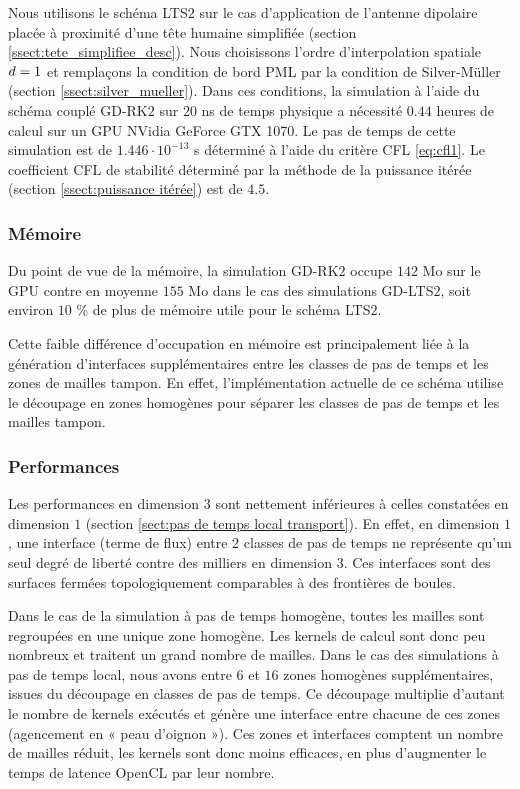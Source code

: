 Nous utilisons le schéma LTS$2$ sur le cas d'application de
l'antenne dipolaire placée à proximité d'une tête humaine simplifiée
(section \ref{ssect:tete_simplifiee_desc}).
Nous choisissons l'ordre d'interpolation spatiale $d = 1$ et
remplaçons la condition de bord PML par la condition de
Silver-Müller (section \ref{ssect:silver_mueller}).
Dans ces conditions, la simulation à l'aide du schéma couplé GD-RK$2$
sur $20$ ns de temps physique a nécessité $0.44$ heures de calcul
sur un GPU NVidia GeForce GTX 1070.
Le pas de temps de cette simulation est de $1.446 \cdot 10^{-13}$ s
déterminé à l'aide du critère CFL \eqref{eq:cfl1}.
Le coefficient CFL de stabilité déterminé par la méthode
de la puissance itérée (section \ref{ssect:puissance itérée})
est de $4.5$.


\subsubsection{Mémoire}

Du point de vue de la mémoire, la simulation GD-RK$2$ occupe $142$ Mo sur le
GPU contre en moyenne $155$ Mo dans le cas des simulations GD-LTS$2$,
soit environ $10$ \% de plus de mémoire utile pour le schéma LTS$2$.

Cette faible différence d'occupation en mémoire est principalement liée à la
génération d'interfaces supplémentaires entre les classes de pas de temps
et les zones de mailles tampon.
En effet, l'implémentation actuelle de ce schéma utilise le découpage en zones homogènes
pour séparer les classes de pas de temps et les mailles tampon.


\subsubsection{Performances}


Les performances en dimension $3$ sont nettement inférieures à celles constatées en
dimension $1$ (section \ref{sect:pas de temps local transport}).
En effet, en dimension $1$, une interface (terme de flux) entre $2$ classes de pas de
temps ne représente qu'un seul degré de liberté contre des milliers en dimension $3$.
Ces interfaces sont des surfaces fermées topologiquement comparables à des
frontières de boules.

Dans le cas de la simulation à pas de temps homogène, toutes les mailles
sont regroupées en une unique zone homogène.
Les kernels de calcul sont donc peu nombreux et traitent un grand nombre
de mailles.
Dans le cas des simulations à pas de temps local, nous avons entre $6$ et $16$
zones homogènes supplémentaires, issues du découpage en classes de pas de temps.
Ce découpage multiplie d'autant le nombre de kernels exécutés et génère
une interface entre chacune de ces zones (agencement en « peau d'oignon »).
Ces zones et interfaces comptent un nombre de mailles réduit, les kernels sont donc
moins efficaces, en plus d'augmenter le temps de latence OpenCL
par leur nombre.

